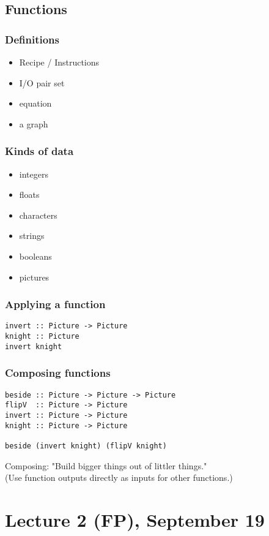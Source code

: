 \documentclass{article}
\begin{document}
\subsection{Functions}
\subsubsection{Definitions}
\begin{itemize}
	\item Recipe / Instructions
	\item I/O pair set
	\item equation
	\item a graph
\end{itemize}
\subsubsection{Kinds of data}
\begin{itemize}
	\item integers
	\item floats
	\item characters
	\item strings
	\item booleans
	\item pictures
\end{itemize}
\subsubsection{Applying a function}
\begin{verbatim}
invert :: Picture -> Picture
knight :: Picture
invert knight
\end{verbatim}
\subsubsection{Composing functions}
\begin{verbatim}
beside :: Picture -> Picture -> Picture
flipV  :: Picture -> Picture
invert :: Picture -> Picture
knight :: Picture -> Picture

beside (invert knight) (flipV knight)
\end{verbatim}
Composing: "Build bigger things out of littler things."\\
(Use function outputs directly as inputs for other functions.)
\section{Lecture 2 (FP), September 19}
\end{document}
